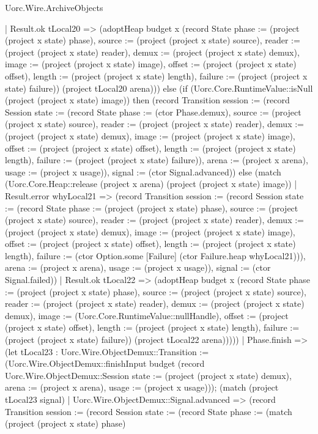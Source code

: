 \begin{lexlean}{Uorc.Wire.ArchiveObjects}
\begin{semanticmodule}
{          | Result.ok tLocal20 => (adoptHeap budget x (record State {phase := (project (project x state) phase), source := (project (project x state) source), reader := (project (project x state) reader), demux := (project (project x state) demux), image := (project (project x state) image), offset := (project (project x state) offset), length := (project (project x state) length), failure := (project (project x state) failure)}) (project tLocal20 arena))) else (if (Uorc.Core.RuntimeValue::isNull (project (project x state) image)) then (record Transition {session := (record Session {state := (record State {phase := (ctor Phase.demux), source := (project (project x state) source), reader := (project (project x state) reader), demux := (project (project x state) demux), image := (project (project x state) image), offset := (project (project x state) offset), length := (project (project x state) length), failure := (project (project x state) failure)}), arena := (project x arena), usage := (project x usage)}), signal := (ctor Signal.advanced)}) else (match (Uorc.Core.Heap::release (project x arena) (project (project x state) image))
          | Result.error whyLocal21 => (record Transition {session := (record Session {state := (record State {phase := (project (project x state) phase), source := (project (project x state) source), reader := (project (project x state) reader), demux := (project (project x state) demux), image := (project (project x state) image), offset := (project (project x state) offset), length := (project (project x state) length), failure := (ctor Option.some [Failure] (ctor Failure.heap whyLocal21))}), arena := (project x arena), usage := (project x usage)}), signal := (ctor Signal.failed)})
          | Result.ok tLocal22 => (adoptHeap budget x (record State {phase := (project (project x state) phase), source := (project (project x state) source), reader := (project (project x state) reader), demux := (project (project x state) demux), image := (Uorc.Core.RuntimeValue::nullHandle), offset := (project (project x state) offset), length := (project (project x state) length), failure := (project (project x state) failure)}) (project tLocal22 arena)))))
        | Phase.finish => (let tLocal23 : Uorc.Wire.ObjectDemux::Transition := (Uorc.Wire.ObjectDemux::finishInput budget (record Uorc.Wire.ObjectDemux::Session {state := (project (project x state) demux), arena := (project x arena), usage := (project x usage)})); (match (project tLocal23 signal)
          | Uorc.Wire.ObjectDemux::Signal.advanced => (record Transition {session := (record Session {state := (record State {phase := (match (project (project x state) phase)
}}}}
\end{semanticmodule}
\end{lexlean}
